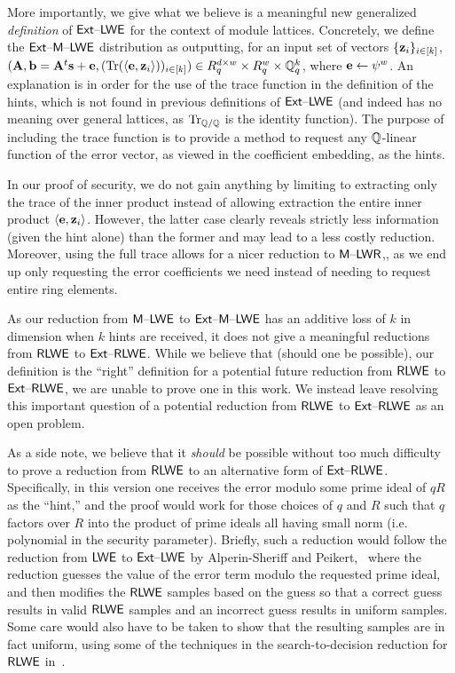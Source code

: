 More importantly, we give what we believe is a meaningful new generalized
\emph{definition} of $\mathsf{Ext \text{\textendash} LWE}$ for the context of module lattices.  
Concretely, we define the $\mathsf{Ext \text{\textendash} M \text{\textendash} LWE}$  distribution as outputting, for
an input set of vectors $\{\mathbf{z}_i\}_{i \in [k]}$,
$(\mathbf{A}, \mathbf{b}=\mathbf{A}^t\mathbf{s}+\mathbf{e}, (\operatorname{Tr}(\langle\mathbf{e},\mathbf{z}_{i}\rangle))_{i \in [k]}) \in R_q^{d
  \times w} \times R_q^{w} \times \mathbb{Q}_q^k$,
where $\mathbf{e} \gets \psi^{w}$.
An explanation is in order for the use of the trace function in the
definition of the hints, which is not found in previous definitions of
$\mathsf{Ext \text{\textendash} LWE}$ (and indeed has no meaning over general lattices, as
$\operatorname{Tr}_{\mathbb{Q}/\mathbb{Q}}$ is the identity function). The purpose of including
the trace function is to provide a method to request any $\mathbb{Q}$-linear
function of the error vector, as viewed in the coefficient embedding,
as the hints. 

In our proof of security, we do not gain anything by limiting to extracting
only the trace of the inner product instead of allowing extraction the
entire inner product $\langle\mathbf{e},\mathbf{z}_i\rangle$. However, the latter case
clearly reveals strictly less information (given the hint alone) than the
former and may lead to a less costly reduction. Moreover, using
the full trace allows for a nicer reduction to $\mathsf{M \text{\textendash} LWR}$,, as we end up only requesting the error coefficients we
need instead of needing to request entire ring elements.

As our reduction from $\mathsf{M \text{\textendash} LWE}$ to $\mathsf{Ext \text{\textendash} M \text{\textendash} LWE}$ has an additive loss of
$k$ in dimension when $k$ hints are received, it does not give a
meaningful reductions from $\mathsf{RLWE}$ to $\mathsf{Ext \text{\textendash} RLWE}$. While we believe
that (should one be possible), our definition is the ``right''
definition for a potential future reduction from $\mathsf{RLWE}$ to
$\mathsf{Ext \text{\textendash} RLWE}$, we are unable to prove one in this work. We instead leave
resolving this important question of a potential reduction from
$\mathsf{RLWE}$ to $\mathsf{Ext \text{\textendash} RLWE}$ as an
open problem.

\iflncs

\else
As a side note, we believe that it \emph{should} be possible without too much difficulty to prove
a reduction from $\mathsf{RLWE}$ to an alternative form of
$\mathsf{Ext \text{\textendash} RLWE}$. Specifically, in this version one receives
the error modulo some prime ideal of $qR$ as the ``hint,'' and the
proof would work for those choices of $q$ and $R$ such that $q$
factors over $R$ into the product of prime ideals all having small norm (i.e. polynomial in the security parameter).  
Briefly, such a reduction would follow the reduction from $\mathsf{LWE}$ to
$\mathsf{Ext \text{\textendash} LWE}$ by Alperin-Sheriff and
Peikert,~\cite{DBLP:conf/pkc/Alperin-SheriffP12} where the reduction
guesses the value of the error term modulo the requested prime ideal,
and then modifies the $\mathsf{RLWE}$ samples based on the guess so that a
correct guess results in valid $\mathsf{RLWE}$ samples and an incorrect guess
results in uniform samples. Some care would also have to be taken to
show that the resulting samples are in fact uniform, using some of the
techniques in the search-to-decision reduction for $\mathsf{RLWE}$ in~\cite{DBLP:journals/jacm/LyubashevskyPR13}.

